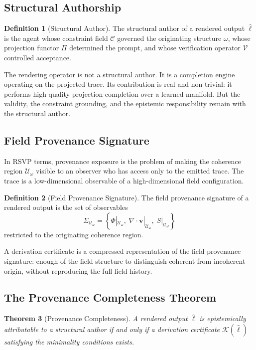 \documentclass[12pt, a4paper]{article}
\theoremstyle{plain}
\newtheorem{theorem}{Theorem}[section]
\theoremstyle{definition}
\newtheorem{definition}[theorem]{Definition}
\theoremstyle{remark}
\begin{document}
\subsection{Structural Authorship}

\begin{definition}[Structural Author]
The structural author of a rendered output $\hat{\ell}$ is the agent whose constraint field $\mathcal{C}$ governed the originating structure $\omega$, whose projection functor $\Pi$ determined the prompt, and whose verification operator $\mathcal{V}$ controlled acceptance.
\end{definition}

The rendering operator is not a structural author. It is a completion engine operating on the projected trace. Its contribution is real and non-trivial: it performs high-quality projection-completion over a learned manifold. But the validity, the constraint grounding, and the epistemic responsibility remain with the structural author.

\subsection{Field Provenance Signature}

In RSVP terms, provenance exposure is the problem of making the coherence region $\mathcal{U}_\omega$ visible to an observer who has access only to the emitted trace. The trace is a low-dimensional observable of a high-dimensional field configuration.

\begin{definition}[Field Provenance Signature]
The field provenance signature of a rendered output is the set of observables
\[
\Sigma_{\mathcal{U}_\omega} = \left\{\Phi|_{\mathcal{U}_\omega},\; \nabla \cdot \mathbf{v}|_{\mathcal{U}_\omega},\; S|_{\mathcal{U}_\omega}\right\}
\]
restricted to the originating coherence region.
\end{definition}

A derivation certificate is a compressed representation of the field provenance signature: enough of the field structure to distinguish coherent from incoherent origin, without reproducing the full field history.

\subsection{The Provenance Completeness Theorem}

\begin{theorem}[Provenance Completeness]
A rendered output $\hat{\ell}$ is epistemically attributable to a structural author if and only if a derivation certificate $\mathcal{K}(\hat{\ell})$ satisfying the minimality conditions exists.
\end{theorem}
\end{document}
